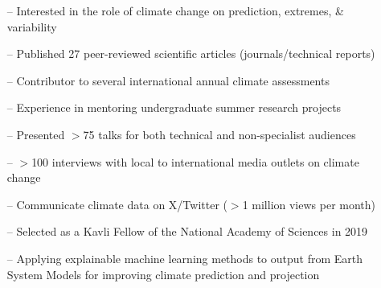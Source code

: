 \documentclass[10pt,a4paper]{altacv}
\begin{document}

%

\begin{fullwidth}
\makecvheader
\end{fullwidth}

%

\vspace{-0.09in}
\begin{itemize}
    \setlength{\itemindent}{0.5em}
    \item[--] \small{Interested in the role of climate change on prediction, extremes, \& variability}
    \item[--] \small{Published 27 peer-reviewed scientific articles (journals/technical reports)}
    \item[--] \small{Contributor to several international annual climate assessments}
    \item[--] \small{Experience in mentoring undergraduate summer research projects}
    \item[--] \small{Presented $>$75 talks for both technical and non-specialist audiences}
    \item[--] \small{$>$100 interviews with local to international media outlets on climate change}
    \item[--] \small{Communicate climate data on X/Twitter ($>$1 million views per month)}
    \item[--] \small{Selected as a Kavli Fellow of the National Academy of Sciences in 2019}
\end{itemize}
\medskip



\begin{itemize}
    \setlength{\itemindent}{0.5em}
    \item[--]   \small{Applying explainable machine learning methods to output from Earth System Models for improving climate prediction and projection}
\end{itemize}
\medskip
\end{document}
